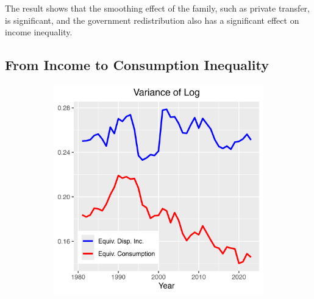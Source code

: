 \documentclass{article}
\begin{document}
The result shows that the smoothing effect of the family, such as private transfer, is significant, and the government redistribution also has a significant effect on income inequality.

\subsection{From Income to Consumption Inequality}

\begin{figure}
    \centering
    \begin{subfigure}[t]{0.475\textwidth}
        \centering
        \includegraphics[width=\textwidth]{figures/Fig_6/Fig_6a.png}
        \label{fig:Consumption_Var}
    \end{subfigure}
    \begin{subfigure}[t]{0.475\textwidth}
        \centering

\end{subfigure}
\end{figure}
\end{document}
